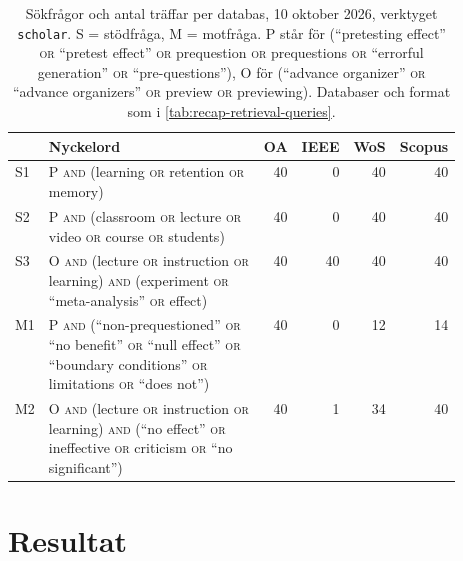\begin{table}[htbp]
  \centering
  \caption{Sökfrågor och antal träffar per databas, 10 oktober 2026,
    verktyget \texttt{scholar}.  S = stödfråga, M = motfråga.  P står
    för (\enquote{pretesting effect} \textsc{or} \enquote{pretest
    effect} \textsc{or} prequestion \textsc{or} prequestions \textsc{or}
    \enquote{errorful generation} \textsc{or} \enquote{pre-questions}),
    O för (\enquote{advance organizer} \textsc{or} \enquote{advance
    organizers} \textsc{or} preview \textsc{or} previewing).  Databaser
    och format som i \cref{tab:recap-retrieval-queries}.}
  \label{tab:recap-pretest-queries}
  \footnotesize
  \begin{tabular}{@{}lp{0.52\linewidth}rrrr@{}}
    \toprule
    & Nyckelord & OA & IEEE & WoS & Scopus \\
    \midrule
    S1 & P \textsc{and} (learning \textsc{or} retention \textsc{or}
      memory)
      & 40 & 0 & 40 & 40 \\
    S2 & P \textsc{and} (classroom \textsc{or} lecture \textsc{or} video
      \textsc{or} course \textsc{or} students)
      & 40 & 0 & 40 & 40 \\
    S3 & O \textsc{and} (lecture \textsc{or} instruction \textsc{or}
      learning) \textsc{and} (experiment \textsc{or}
      \enquote{meta-analysis} \textsc{or} effect)
      & 40 & 40 & 40 & 40 \\
    M1 & P \textsc{and} (\enquote{non-prequestioned} \textsc{or}
      \enquote{no benefit} \textsc{or} \enquote{null effect} \textsc{or}
      \enquote{boundary conditions} \textsc{or} limitations \textsc{or}
      \enquote{does not})
      & 40 & 0 & 12 & 14 \\
    M2 & O \textsc{and} (lecture \textsc{or} instruction \textsc{or}
      learning) \textsc{and} (\enquote{no effect} \textsc{or} ineffective
      \textsc{or} criticism \textsc{or} \enquote{no significant})
      & 40 & 1 & 34 & 40 \\
    \bottomrule
  \end{tabular}
\end{table}

\section{Resultat}
\label{sec:recap-pretest-resultat}

